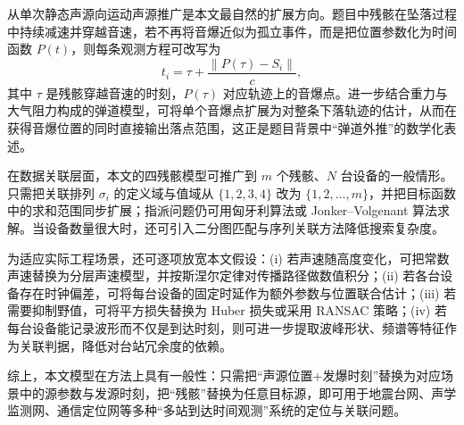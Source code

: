 \documentclass[12pt,a4paper]{article}
\newcommand{\tip}[1]{\par\noindent\textbf{【提示】} #1\par}
\begin{document}
从单次静态声源向运动声源推广是本文最自然的扩展方向。题目中残骸在坠落过程中持续减速并穿越音速，若不再将音爆近似为孤立事件，而是把位置参数化为时间函数 $P(t)$，则每条观测方程可改写为
\[
t_i=\tau+\frac{\|P(\tau)-S_i\|}{c},
\]
其中 $\tau$ 是残骸穿越音速的时刻，$P(\tau)$ 对应轨迹上的音爆点。进一步结合重力与大气阻力构成的弹道模型，可将单个音爆点扩展为对整条下落轨迹的估计，从而在获得音爆位置的同时直接输出落点范围，这正是题目背景中“弹道外推”的数学化表述。

在数据关联层面，本文的四残骸模型可推广到 $m$ 个残骸、$N$ 台设备的一般情形。只需把关联排列 $\sigma_i$ 的定义域与值域从 $\{1,2,3,4\}$ 改为 $\{1,2,\dots,m\}$，并把目标函数中的求和范围同步扩展；指派问题仍可用匈牙利算法或 Jonker--Volgenant 算法求解。当设备数量很大时，还可引入二分图匹配与序列关联方法降低搜索复杂度。

为适应实际工程场景，还可逐项放宽本文假设：(i) 若声速随高度变化，可把常数声速替换为分层声速模型，并按斯涅尔定律对传播路径做数值积分；(ii) 若各台设备存在时钟偏差，可将每台设备的固定时延作为额外参数与位置联合估计；(iii) 若需要抑制野值，可将平方损失替换为 Huber 损失或采用 RANSAC 策略；(iv) 若每台设备能记录波形而不仅是到达时刻，则可进一步提取波峰形状、频谱等特征作为关联判据，降低对台站冗余度的依赖。

综上，本文模型在方法上具有一般性：只需把“声源位置+发爆时刻”替换为对应场景中的源参数与发源时刻，把“残骸”替换为任意目标源，即可用于地震台网、声学监测网、通信定位网等多种“多站到达时间观测”系统的定位与关联问题。




\end{document}
